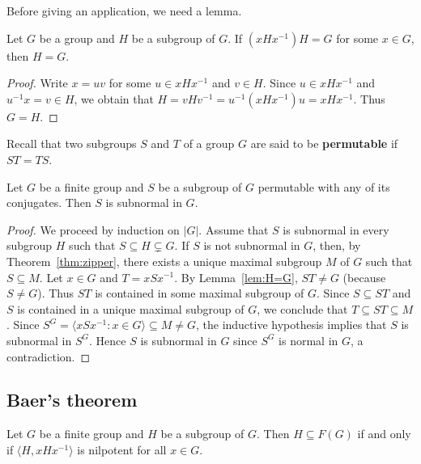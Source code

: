 Before giving an application, we need a lemma. 

\begin{lemma}
	\label{lem:H=G}
	Let $G$ be a group and $H$ be a subgroup of $G$. If $(xHx^{-1})H=G$ for some 
	$x\in G$, then $H=G$.
\end{lemma}

\begin{proof}
	Write $x=uv$ for some $u\in xHx^{-1}$ and $v\in H$. Since $u\in xHx^{-1}$ and 
	$u^{-1}x=v\in H$, we obtain that 
	$H=vHv^{-1}=u^{-1}(xHx^{-1})u=xHx^{-1}$. Thus 
	$G=H$. 
\end{proof}

Recall that two subgroups $S$ and $T$ of a group $G$ are said to be \textbf{permutable} if 
$ST=TS$. 

\begin{theorem}
	Let $G$ be a finite group and $S$ be a subgroup of $G$ permutable with any of its conjugates. Then 
	$S$ is subnormal in $G$. 
\end{theorem}

\begin{proof}
	We proceed by induction on $|G|$. Assume that $S$ is subnormal in 
	every subgroup $H$ such that $S\subseteq H\subsetneq G$.  If $S$ is not subnormal in $G$, 
	then, by Theorem~\ref{thm:zipper}, there exists a unique maximal subgroup $M$ of $G$ 
	such that $S\subseteq M$. Let $x\in G$ and 
	$T=xSx^{-1}$. By Lemma~\ref{lem:H=G}, $ST\ne G$ (because $S\ne G$). Thus 
	$ST$ is contained in some maximal subgroup of $G$. Since 
	$S\subseteq ST$ and $S$ is contained in a unique maximal subgroup of $G$, we conclude that 
	$T\subseteq ST\subseteq M$.  Since $S^G=\langle xSx^{-1}:x\in
	G\rangle\subseteq M\ne G$, the inductive hypothesis implies that $S$ is subnormal in
	$S^G$. Hence $S$ is subnormal in $G$ since $S^G$ is normal in $G$, a contradiction. 
\end{proof}

\subsection{Baer's theorem}

\begin{theorem}[Baer]
	\label{thm:Baer}
	Let $G$ be a finite group and $H$ be a subgroup of $G$. Then $H\subseteq
	F(G)$ if and only if $\langle H,xHx^{-1}\rangle$ is nilpotent for all 
	$x\in G$.
\end{theorem}

